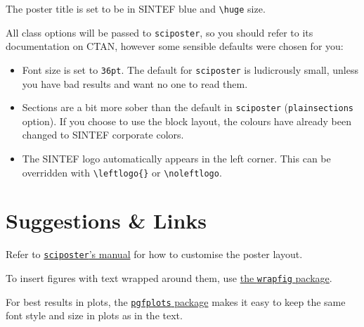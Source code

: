 \documentclass[landscape]{sintefposter}
\begin{document}
\begin{multicols}{3}
The poster title is set to be in SINTEF blue and \verb|\huge| size.

All class options will be passed to \texttt{sciposter}, so you should refer to
its documentation on CTAN, however some sensible defaults were chosen for you:
\begin{itemize}
  \item Font size is set to \texttt{36pt}. The default for \texttt{sciposter} is
        ludicrously small, unless you have bad results and want no one to read
        them.
  \item Sections are a bit more sober than the default in \texttt{sciposter}
        (\texttt{plainsections} option).
        If you choose to use the block layout, the colours have already been
        changed to SINTEF corporate colors.
  \item The SINTEF logo automatically appears in the left corner.
        This can be overridden with \verb|\leftlogo{}| or \verb|\noleftlogo|.
\end{itemize}

\section*{Suggestions \& Links}
Refer to
\href{http://mirrors.ctan.org/macros/latex/contrib/sciposter/scipostermanual.pdf}
{\texttt{sciposter}'s manual} for how to customise the poster layout.

To insert figures with text wrapped around them, use
\href{http://mirrors.ctan.org/macros/latex/contrib/wrapfig/wrapfig-doc.pdf}{the
\texttt{wrapfig} package}.

For best results in plots, the
\href{http://mirrors.ctan.org/graphics/pgf/contrib/pgfplots/doc/latex/pgfplots/pgfplots.pdf}
{\texttt{pgfplots} package} makes it easy to keep the same font style and size
in plots as in the text.

\end{multicols}
\end{document}
